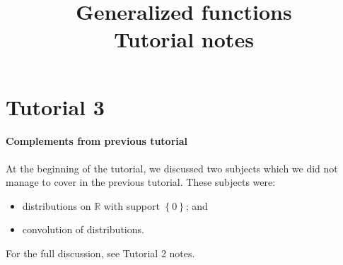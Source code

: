 \documentclass[12pt, reqno,a4paper, twoside]{amsproc}
\title{Generalized functions\\Tutorial notes}
\newcommand{\dbR}{\mathbb R}
\newcommand{\set}[1]{\left\{{#1}\right\}}
\begin{document}
\maketitle
\part*{Tutorial 3}\setcounter{section}{3}
\subsection{Complements from previous tutorial}
At the beginning of the tutorial, we discussed two subjects which we did not manage to cover in the previous tutorial. These subjects were:
\begin{itemize}
	\item distributions on $\dbR$ with support $\set{0}$; and
	\item convolution of distributions. 
\end{itemize}
For the full discussion, see Tutorial 2 notes.
\end{document}
